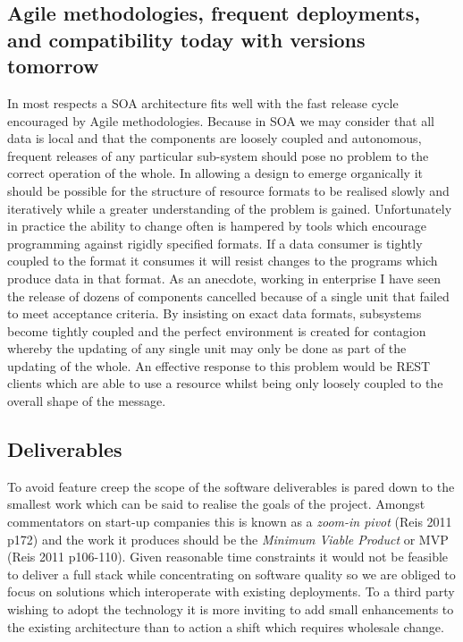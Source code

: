 \documentclass[12pt, ]{article}
\begin{document}
\subsection{Agile methodologies, frequent deployments, and compatibility
today with versions
tomorrow}\label{agile-methodologies-frequent-deployments-and-compatibility-today-with-versions-tomorrow}

In most respects a SOA architecture fits well with the fast release
cycle encouraged by Agile methodologies. Because in SOA we may consider
that all data is local and that the components are loosely coupled and
autonomous, frequent releases of any particular sub-system should pose
no problem to the correct operation of the whole. In allowing a design
to emerge organically it should be possible for the structure of
resource formats to be realised slowly and iteratively while a greater
understanding of the problem is gained. Unfortunately in practice the
ability to change often is hampered by tools which encourage programming
against rigidly specified formats. If a data consumer is tightly coupled
to the format it consumes it will resist changes to the programs which
produce data in that format. As an anecdote, working in enterprise I
have seen the release of dozens of components cancelled because of a
single unit that failed to meet acceptance criteria. By insisting on
exact data formats, subsystems become tightly coupled and the perfect
environment is created for contagion whereby the updating of any single
unit may only be done as part of the updating of the whole. An effective
response to this problem would be REST clients which are able to use a
resource whilst being only loosely coupled to the overall shape of the
message.

\subsection{Deliverables}\label{deliverables}

To avoid feature creep the scope of the software deliverables is pared
down to the smallest work which can be said to realise the goals of the
project. Amongst commentators on start-up companies this is known as a
\emph{zoom-in pivot} (Reis 2011 p172) and the work it produces should be
the \emph{Minimum Viable Product} or MVP (Reis 2011 p106-110). Given
reasonable time constraints it would not be feasible to deliver a full
stack while concentrating on software quality so we are obliged to focus
on solutions which interoperate with existing deployments. To a third
party wishing to adopt the technology it is more inviting to add small
enhancements to the existing architecture than to action a shift which
requires wholesale change.
\end{document}
